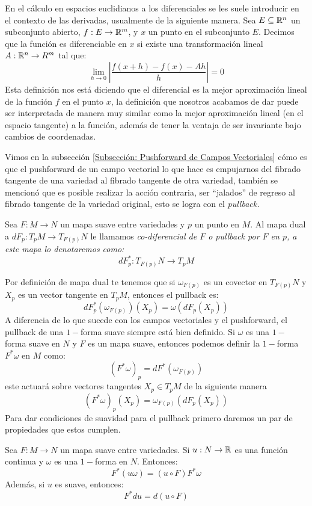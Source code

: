 En el cálculo en espacios euclidianos a los diferenciales se les suele introducir en el contexto de las derivadas, usualmente de la siguiente manera. Sea $E \subseteq \mathbb{R}^n$ un subconjunto abierto, $f: E \to \mathbb{R}^m$, y $x$ un punto en el subconjunto $E$. Decimos que la función es diferenciable en $x$ si existe una transformación lineal $A: \mathbb{R}^n \to R^m$ tal que:
\[
	\lim_{h \to 0} \left| \frac{f(x+h) - f(x) - Ah}{h} \right| = 0
\]
Esta definición nos está diciendo que el diferencial es la mejor aproximación lineal de la función $f$ en el punto $x$, la definición que nosotros acabamos de dar puede ser interpretada de manera muy similar como la mejor aproximación lineal (en el espacio tangente) a la función, además de tener la ventaja de ser invariante bajo cambios de coordenadas.

Vimos en la subsección \ref{Subsección: Pushforward de Campos Vectoriales} cómo es que el pushforward de un campo vectorial lo que hace es empujarnos del fibrado tangente de una variedad al fibrado tangente de otra variedad, también se mencionó que es posible realizar la acción contraria, ser \enquote{jalados} de regreso al fibrado tangente de la variedad original, esto se logra con el \it{pullback}.

\begin{definition}[Pullback]
	Sea $F: M \to N$ un mapa suave entre variedades y $p$ un punto en $M$. Al mapa dual a $dF_p: T_pM \to T_{F(p)}N$ le llamamos \it{co-diferencial de $F$} o \it{pullback por $F$ en $p$}, a este mapa lo denotaremos como:
	\[
		dF_p^*: T_{F(p)}N \to T_pM
	\]
\end{definition}

Por definición de mapa dual te tenemos que si $\omega_{F(p)}$ es un covector en $T_{F(p)}N$ y $X_p$ es un vector tangente en $T_pM$, entonces el pullback es:
\[
	dF_{p}^{*}(\omega_{F(p)})(X_p) = \omega(dF_p(X_p))
\]
A diferencia de lo que sucede con los campos vectoriales y el pushforward, el pullback de una  $1-$forma suave siempre está bien definido. Si $\omega$ es una $1-$forma suave en $N$ y $F$ es un mapa suave, entonces podemos definir la $1-$forma $F^* \omega$ en $M$ como:
\[
	(F^*\omega)_p = dF^* (\omega_{F(p)})
\]
este actuará sobre vectores tangentes $X_p \in T_pM$ de la siguiente manera
\[
	(F^*\omega)_p(X_p) = \omega_{F(p)}(dF_p(X_p))
\]
Para dar condiciones de suavidad para el pullback primero daremos un par de propiedades que estos cumplen.
\begin{lemma}
	Sea $F: M \to N$ un mapa suave entre variedades. Si $u: N \to \mathbb{R}$ es una función continua y $\omega$ es una $1-$forma en $N$. Entonces:
	\[
		F^{*}(u \omega) = (u \circ F) F^*\omega
	\]
	Además, si $u$ es suave, entonces:
	\[
		F^* du = d(u \circ F)
	\]
\end{lemma}

